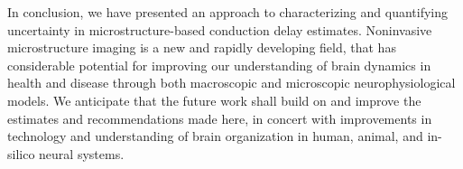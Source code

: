 {In conclusion, we have presented an approach to characterizing and quantifying uncertainty in microstructure-based conduction delay estimates. Noninvasive microstructure imaging is a new and rapidly developing field, that has considerable potential for improving our understanding of brain dynamics in health and disease through both macroscopic and microscopic neurophysiological models. We anticipate that the future work shall build on and improve the estimates and recommendations made here, in concert with improvements in technology and understanding of brain organization in human, animal, and in-silico neural systems. 













}
